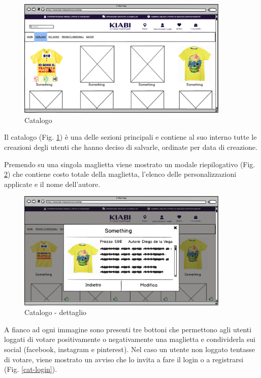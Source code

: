 \documentclass[12pt,italian,]{report}
\begin{document}
\begin{figure}[h]
\centering
\includegraphics[width=0.9\textwidth]{../balsamiq/balsamiq_finale/Catalogo.png}
\caption{Catalogo}
\label{catalogo}
\end{figure}

Il catalogo (Fig. \ref{catalogo}) è una delle sezioni principali e contiene al suo interno tutte le creazioni degli utenti che hanno deciso di salvarle, ordinate per data di creazione.

Premendo su una singola maglietta viene mostrato un modale riepilogativo (Fig. \ref{cat-dett})
che contiene costo totale della maglietta, l'elenco delle
personalizzazioni applicate e il nome dell'autore.

\begin{figure}[h]
\centering
\includegraphics[width=0.9\textwidth]{../balsamiq/balsamiq_finale/Catalogodetails.png}
\caption{Catalogo - dettaglio}
\label{cat-dett}
\end{figure}

A fianco ad ogni immagine sono presenti tre bottoni che permettono agli
utenti loggati di votare positivamente o negativamente una maglietta e condividerla sui social (facebook, instagram e pinterest).
Nel caso un utente non loggato tentasse di votare, viene mostrato un
avviso che lo invita a fare il login o a registrarsi (Fig. \ref{cat-login}).
\end{document}
